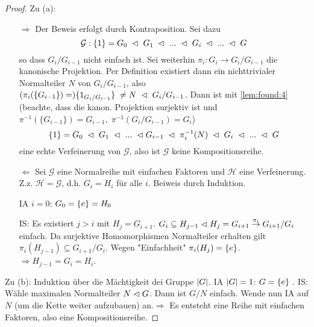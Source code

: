 \documentclass[../main.tex]{subfiles}
\begin{document}
\begin{proof}
    Zu (a): 
    \begin{itemize}
        \item[$\Rightarrow$] Der Beweis erfolgt durch Kontraposition. Sei dazu $$\mathcal{G}: \{1\} = G_0 \; \vartriangleleft \; G_1 \; \vartriangleleft \; ... \; \vartriangleleft \; G_i \; \vartriangleleft \; ... \; \vartriangleleft \; G$$ so dass $G_i/G_{i-1}$ nicht einfach ist. Sei weiterhin $\pi_i: G_i \rightarrow G_i/G_{i-1}$ die kanonische Projektion. Per Definition existiert dann ein nichttrivialer Normalteiler $N$ von $G_i/G_{i-1}$, also $(\pi_i(\{G_{i-1}\}) =) \{1_{G_i/G_{i-1}}\} \; \neq N \; \vartriangleleft \; G_i/G_{i-1}$. Dann ist mit \cref{lem:found:4} (beachte, dass die kanon. Projektion surjektiv ist und $\pi^{-1}(\{G_{i-1}\}) = G_{i-1}, \; \pi^{-1}(G_i/G_{i-1}) = G_i$) $$\{1\} = G_0 \; \vartriangleleft \; G_1 \; \vartriangleleft \; ... \; \vartriangleleft G_{i-1} \; \vartriangleleft \; \pi_i^{-1}(N) \; \vartriangleleft \; G_i \; \vartriangleleft \; ... \; \vartriangleleft \; G$$ eine echte Verfeinerung von $\mathcal{G}$, also ist $\mathcal{G}$ keine Kompositionsreihe.
        \item[$\Leftarrow$] Sei $\mathcal{G}$ eine Normalreihe mit einfachen Faktoren und $\mathcal{H}$ eine Verfeinerung. Z.z. $\mathcal{H} = \mathcal{G}$, d.h. $G_i = H_i$ für alle $i$. Beiweis durch Induktion.

        IA  $i=0$: $G_0=\{e\}=H_0$ \checkmark

        IS: Es existiert $j>i$ mit $H_j = G_{i+1}$. $G_i \subseteq H_{j-1}\vartriangleleft H_j = G_{i+1} \overset{\pi_i}{\rightarrow} G_{i+1}/G_i$ einfach. Da surjektive Homomorphismen Normalteiler erhalten gilt $\pi_i(H_{j-1})\subseteq G_{i+1}/G_i$. Wegen "Einfachheit" $\pi_i(H_j)=\{e\}$. $\Rightarrow H_{j-1} = G_i = H_i$.
    \end{itemize}
    Zu (b):
    Induktion über die Mächtigkeit dei Gruppe $\left\vert G \right\vert$. IA $\left\vert G \right\vert=1$: $G=\{e\}$ \checkmark.
    IS: Wähle maximalen Normalteiler $N\vartriangleleft G$. Dann ist $G/N$ einfach. Wende nun IA auf $N$ (um die Kette weiter aufzubauen) an.$\Rightarrow$ Es entsteht eine Reihe mit einfachen Faktoren, also eine Kompositionsreihe.
\end{proof}
\end{document}
